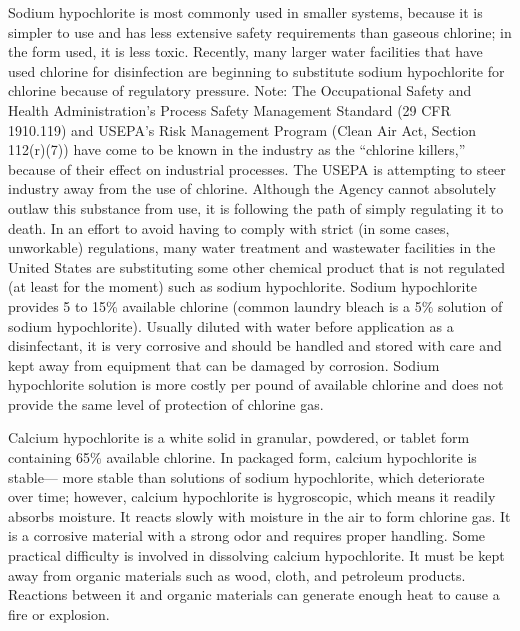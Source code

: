 \documentclass{article}
\begin{document}
Sodium hypochlorite is most commonly used in smaller systems, because it
is simpler to use and has less extensive safety requirements than
gaseous chlorine; in the form used, it is less toxic. Recently, many
larger water facilities that have used chlorine for disinfection are
beginning to substitute sodium hypochlorite for chlorine because of
regulatory pressure. Note: The Occupational Safety and Health
Administration's Process Safety Management Standard (29 CFR 1910.119)
and USEPA's Risk Management Program (Clean Air Act, Section 112(r)(7))
have come to be known in the industry as the ``chlorine killers,''
because of their effect on industrial processes. The USEPA is attempting
to steer industry away from the use of chlorine. Although the Agency
cannot absolutely outlaw this substance from use, it is following the
path of simply regulating it to death. In an effort to avoid having to
comply with strict (in some cases, unworkable) regulations, many water
treatment and wastewater facilities in the United States are
substituting some other chemical product that is not regulated (at least
for the moment) such as sodium hypochlorite. Sodium hypochlorite
provides 5 to 15\% available chlorine (common laundry bleach is a 5\%
solution of sodium hypochlorite). Usually diluted with water before
application as a disinfectant, it is very corrosive and should be
handled and stored with care and kept away from equipment that can be
damaged by corrosion. Sodium hypochlorite solution is more costly per
pound of available chlorine and does not provide the same level of
protection of chlorine gas.

Calcium hypochlorite is a white solid in granular, powdered, or tablet
form containing 65\% available chlorine. In packaged form, calcium
hypochlorite is stable--- more stable than solutions of sodium
hypochlorite, which deteriorate over time; however, calcium hypochlorite
is hygroscopic, which means it readily absorbs moisture. It reacts
slowly with moisture in the air to form chlorine gas. It is a corrosive
material with a strong odor and requires proper handling. Some practical
difficulty is involved in dissolving calcium hypochlorite. It must be
kept away from organic materials such as wood, cloth, and petroleum
products. Reactions between it and organic materials can generate enough
heat to cause a fire or explosion.
\end{document}
